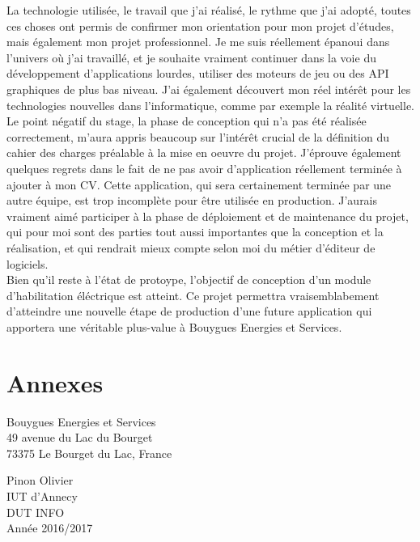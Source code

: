 \documentclass[a4paper]{article}
\begin{document}
    La technologie utilisée, le travail que j'ai réalisé, le rythme que j'ai adopté, toutes ces choses ont permis de confirmer mon orientation pour mon projet d'études, mais également mon projet professionnel. Je me suis réellement épanoui dans l'univers où j'ai travaillé, et je souhaite vraiment continuer dans la voie du développement d'applications lourdes, utiliser des moteurs de jeu ou des API graphiques de plus bas niveau. J'ai également découvert mon réel intérêt pour les technologies nouvelles dans l'informatique, comme par exemple la réalité virtuelle. \\

    Le point négatif du stage, la phase de conception qui n'a pas été réalisée correctement, m'aura appris beaucoup sur l'intérêt crucial de la définition du cahier des charges préalable à la mise en oeuvre du projet. J'éprouve également quelques regrets dans le fait de ne pas avoir d'application réellement terminée à ajouter à mon CV. Cette application, qui sera certainement terminée par une autre équipe, est trop incomplète pour être utilisée en production. J'aurais vraiment aimé participer à la phase de déploiement et de maintenance du projet, qui pour moi sont des parties tout aussi importantes que la conception et la réalisation, et qui rendrait mieux compte selon moi du métier d'éditeur de logiciels. \\

    Bien qu'il reste à l'état de protoype, l'objectif de conception d'un module d'habilitation éléctrique est atteint. Ce projet permettra vraisemblabement d'atteindre une nouvelle étape de production d'une future application qui apportera une véritable plus-value à Bouygues Energies et Services. \\

    \section{Annexes}
    
    \newpage 
    \normalsize
    \thispagestyle{empty}
    \noindent
    \begin{minipage}{.5\textwidth}
        Bouygues Energies et Services \\
        49 avenue du Lac du Bourget \\
        73375 Le Bourget du Lac, France
    \end{minipage}
    \begin{minipage}{.5\textwidth}
    \begin{flushright}
        Pinon Olivier \\
        IUT d'Annecy \\
        DUT INFO \\
        Année 2016/2017 \\
    \end{flushright}
    \end{minipage}
\end{document}
